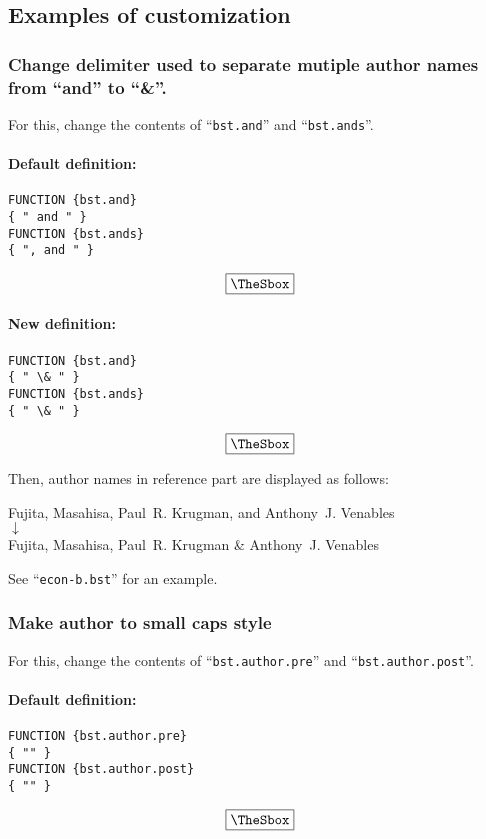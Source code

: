 \documentclass[10pt]{article}
\newenvironment{Frame}%
{\setlength{\fboxsep}{15pt}
\setlength{\mylength}{\linewidth}%
\addtolength{\mylength}{-2\fboxsep}%
\addtolength{\mylength}{-2\fboxrule}%
\Sbox
\minipage{\mylength}%
\setlength{\abovedisplayskip}{0pt}%
\setlength{\belowdisplayskip}{0pt}%
}%
{\endminipage\endSbox
\[\fbox{\TheSbox}\]}
\begin{document}
\subsection{Examples of customization}

\subsubsection{Change delimiter used to separate mutiple author names
   from ``and'' to ``\&''.}

For this, change the contents of ``\texttt{bst.and}'' and ``\texttt{bst.ands}''.
\paragraph{Default definition:}
\begin{Frame}
\begin{verbatim}
FUNCTION {bst.and}
{ " and " }
FUNCTION {bst.ands}
{ ", and " }
\end{verbatim}
\end{Frame}

\paragraph{New definition:}
\begin{Frame}
\begin{verbatim}
FUNCTION {bst.and}
{ " \& " }
FUNCTION {bst.ands}
{ " \& " }
\end{verbatim}
\end{Frame}

Then, author names in reference part are displayed as follows:
\begin{center}
Fujita, Masahisa, Paul~R. Krugman, and Anthony~J. Venables \\
 $\downarrow$ \\
Fujita, Masahisa, Paul~R. Krugman \& Anthony~J. Venables 
\end{center}

See ``\texttt{econ-b.bst}'' for an example.

\subsubsection{Make author to small caps style}

For this, change the contents of ``\texttt{bst.author.pre}'' and ``\texttt{bst.author.post}''.
\paragraph{Default definition:}
\begin{Frame}
\begin{verbatim}
FUNCTION {bst.author.pre}
{ "" }
FUNCTION {bst.author.post}
{ "" }
\end{verbatim}
\end{Frame}
\end{document}
